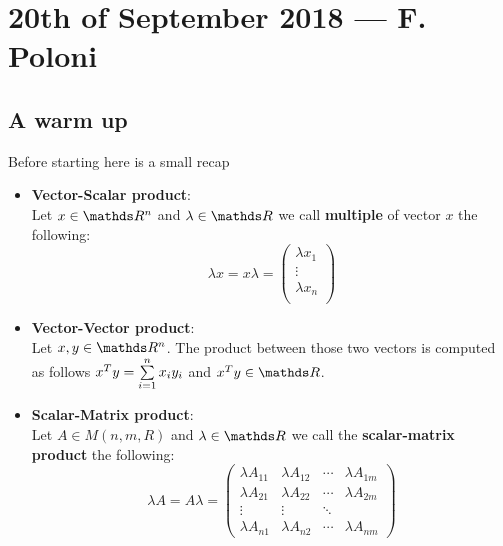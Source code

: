 \documentclass[computationalMathematics.tex]{subfiles}
\begin{document}
\section{20th of September 2018 --- F. Poloni}

\subsection{A warm up}
Before starting here is a small recap
\begin{itemize}
    \item \textbf{Vector-Scalar product}:\\
      Let $x \in \R^n$ and $\lambda \in \R$ we call \textbf{multiple} of vector $x$ the following:
      \[
        \lambda x = x \lambda =
        \begin{pmatrix}
        \lambda x_1\\
        \vdots\\
        \lambda x_n\\
      \end{pmatrix}
      \]
    
    \item \textbf{Vector-Vector product}:\\
     Let $x, y \in \R^n$. The product between those two vectors is computed as follows ${x}^{T} y = \sum\limits_{i=1}^n x_i y_i$ and $\tr{x}y \in \R$.
     
     \item \textbf{Scalar-Matrix product}:\\
      Let $A \in M(n, m, R)$ and $\lambda \in \R$ we call the \textbf{scalar-matrix product} the following:
      \[
        \lambda A = A \lambda = 
        \begin{pmatrix}
        \lambda A_{11} & \lambda A_{12} & \cdots & \lambda A_{1m}\\
        \lambda A_{21} & \lambda A_{22} & \cdots & \lambda A_{2m}\\
        \vdots  &\vdots & \ddots\\
        \lambda A_{n1} & \lambda A_{n2} & \cdots & \lambda A_{nm}
        \end{pmatrix}
      \]
     

\end{itemize}
\end{document}
